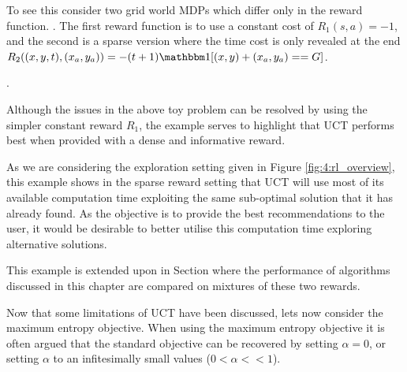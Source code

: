     To see this consider two grid world MDPs which differ only in the reward function. . The first reward function is to use a constant cost of $R_1(s,a)=-1$, and the second is a sparse version where the time cost is only revealed at the end $R_2((x,y,t),(x_a,y_a)) = -(t+1)\one[(x,y)+(x_a,y_a)==G]$. 


    .
    

    Although the issues in the above toy problem can be resolved by using the simpler constant reward $R_1$, the example serves to highlight that UCT performs best when provided with a dense and informative reward. 
    
    As we are considering the exploration setting given in Figure \ref{fig:4:rl_overview}, this example shows in the sparse reward setting that UCT will use most of its available computation time exploiting the same sub-optimal solution that it has already found. As the objective is to provide the best recommendations to the user, it would be desirable to better utilise this computation time exploring alternative solutions. 


    This example is extended upon in Section  where the performance of algorithms discussed in this chapter are compared on mixtures of these two rewards.





    Now that some limitations of UCT have been discussed, lets now consider the maximum entropy objective. When using the maximum entropy objective it is often argued that the standard objective can be recovered by setting $\alpha=0$, or setting $\alpha$ to an infitesimally small values ($0<\alpha<<1$).  

